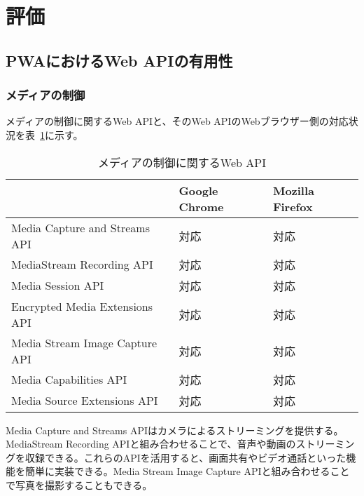 \section{評価}\label{section:評価}
\subsection{PWAにおけるWeb APIの有用性}\label{subsection:PWAにおけるWeb APIの有用性}
\subsubsection{メディアの制御}\label{subsubsection:メディアの制御}
メディアの制御に関するWeb APIと、そのWeb APIのWebブラウザー側の対応状況を表~\ref{table:メディアの制御に関するWeb API}に示す。
\begin{table}
  \centering
  \begin{tabular}{|p{20em}|p{10em}|p{10em}|}
    \hline
    & Google Chrome & Mozilla Firefox \\ \hline
    Media Capture and Streams API & 対応 & 対応 \\ \hline
    MediaStream Recording API & 対応 & 対応 \\ \hline
    Media Session API & 対応 & 対応 \\ \hline
    Encrypted Media Extensions API & 対応 & 対応 \\ \hline
    Media Stream Image Capture API & 対応 & 対応 \\ \hline
    Media Capabilities API & 対応 & 対応 \\ \hline
    Media Source Extensions API & 対応 & 対応 \\ \hline
  \end{tabular}
  \caption{メディアの制御に関するWeb API}\label{table:メディアの制御に関するWeb API}
\end{table}
Media Capture and Streams APIはカメラによるストリーミングを提供する。MediaStream Recording APIと組み合わせることで、音声や動画のストリーミングを収録できる。これらのAPIを活用すると、画面共有やビデオ通話といった機能を簡単に実装できる。Media Stream Image Capture APIと組み合わせることで写真を撮影することもできる。


